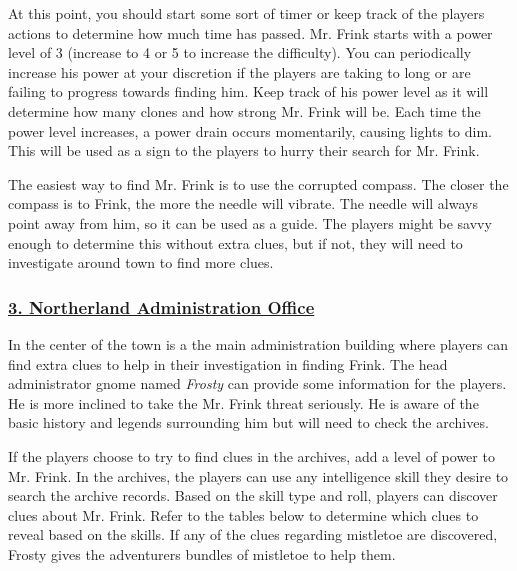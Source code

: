 \documentclass{article}
\begin{document}
\begin{multicols*}{2}
	At this point, you should start some sort of timer or keep track of the players actions to determine how much time has passed. Mr. Frink starts with a power level of 3 (increase to 4 or 5 to increase the difficulty). You can periodically increase his power at your discretion if the players are taking to long or are failing to progress towards finding him. Keep track of his power level as it will determine how many clones and how strong Mr. Frink will be. Each time the power level increases, a power drain occurs momentarily, causing lights to dim. This will be used as a sign to the players to hurry their search for Mr. Frink.
	
	The easiest way to find Mr. Frink is to use the corrupted compass. The closer the compass is to Frink, the more the needle will vibrate. The needle will always point away from him, so it can be used as a guide. The players might be savvy enough to determine this without extra clues, but if not, they will need to investigate around town to find more clues.
	
	\subsubsection*{\underline{3. Northerland Administration Office}}
	
	In the center of the town is a the main administration building where players can find extra clues to help in their investigation in finding Frink. The head administrator gnome named \emph{Frosty} can provide some information for the players. He is more inclined to take the Mr. Frink threat seriously. He is aware of the basic history and legends surrounding him but will need to check the archives.
	
	If the players choose to try to find clues in the archives, add a level of power to Mr. Frink. In the archives, the players can use any intelligence skill they desire to search the archive records. Based on the skill type and roll, players can discover clues about Mr. Frink. Refer to the tables below to determine which clues to reveal based on the skills. If any of the clues regarding mistletoe are discovered, Frosty gives the adventurers bundles of mistletoe to help them.
	

\end{multicols*}
\end{document}
